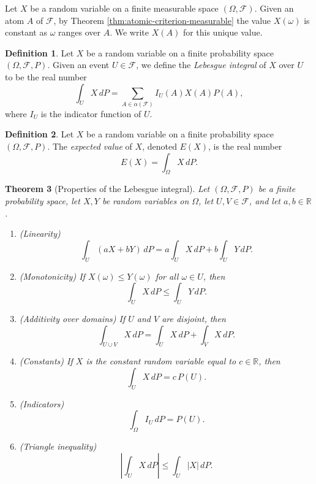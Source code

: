 \documentclass[11pt]{book}
\newtheorem{thm}{Theorem}[section]
\theoremstyle{definition}
\newtheorem{defn}[thm]{Definition}
\numberwithin{equation}{section}
\begin{document}
Let $X$ be a random variable on a finite measurable space $(\Omega, \mathcal{F})$. Given an atom $A$ of $\mathcal{F}$, by Theorem \ref{thm:atomic-criterion-measurable} the value $X(\omega)$ is constant as $\omega$ ranges over $A$. We write $X(A)$ for this unique value.

\begin{defn}
	Let $X$ be a random variable on a finite probability space $(\Omega, \mathcal{F}, P)$. Given an event $U\in \mathcal{F}$, we define the \textit{Lebesgue integral} of $X$ over $U$ to be the real number
	\[
		\int_U X \, dP = \sum_{A\in \alpha(\mathcal{F})} I_U(A)X(A)P(A),
	\]
	where $I_U$ is the indicator function of $U$.
\end{defn}

\begin{defn}
	Let $X$ be a random variable on a finite probability space $(\Omega, \mathcal{F}, P)$. The \textit{expected value} of $X$, denoted $E(X)$, is the real number
	\[
		E(X) = \int_\Omega X \, dP.
	\]
\end{defn}

\begin{thm}[Properties of the Lebesgue integral]\label{thm:integral-properties}
	Let $(\Omega, \mathcal{F}, P)$ be a finite probability space, let $X, Y$ be random variables on $\Omega$, let $U, V \in \mathcal{F}$, and let $a, b \in \mathbb{R}$.
	\begin{enumerate}
		\item (\textit{Linearity})
		      \[
			      \int_U (aX + bY) \, dP = a \int_U X \, dP + b \int_U Y \, dP.
		      \]
		\item (\textit{Monotonicity}) If $X(\omega) \leq Y(\omega)$ for all $\omega \in U$, then
		      \[
			      \int_U X \, dP \leq \int_U Y \, dP.
		      \]
		\item (\textit{Additivity over domains}) If $U$ and $V$ are disjoint, then
		      \[
			      \int_{U \cup V} X \, dP = \int_U X \, dP + \int_V X \, dP.
		      \]
		\item (\textit{Constants}) If $X$ is the constant random variable equal to $c \in \mathbb{R}$, then
		      \[
			      \int_U X \, dP = c \, P(U).
		      \]
		\item (\textit{Indicators})
		      \[
			      \int_\Omega I_U \, dP = P(U).
		      \]
		\item (\textit{Triangle inequality})
		      \[
			      \left| \int_U X \, dP \right| \leq \int_U |X| \, dP.
		      \]
	\end{enumerate}
\end{thm}
\end{document}
